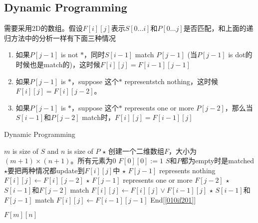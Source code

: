 \subsection{Dynamic Programming}
需要采用2D的数组。假设$F[i][j]$表示$S[0\ldots i]$和$P[0\ldots j]$是否匹配，和上面的递归方法中的分析一样有下面三种情况
\begin{enumerate}
\item 如果$P[j-1]$ is not $\ast$，同时$S[i-1]$ match $P[j-1]$ (当$P[j-1]$ is dot的时候也是match的)，这时候$F[i][j]=F[i-1][j-1]$
\item 如果$P[j-1]$ is $\ast$，suppose 这个$\ast$ representstch nothing，这时候$F[i][j] = F[i][j-2]$。
\item 如果$P[j-1]$ is $\ast$，suppose 这个$\ast$ represents one or more $P[j-2]$，那么当$S[i-1]$和$P[j-2]$ match时，$F[i][j] = F[i-1][j]$
\end{enumerate}
\begin{algorithm}[H]
\caption{Dynamic Programming}
\begin{algorithmic}[1]
 \Comment $m$ is size of $S$ and $n$ is size of $P$
\State $\star$ 创建一个二维数组$F$，大小为$(m+1)\times(n+1)$。所有元素为0
\State $F[0][0]:=1$ \Comment $S$和$P$都为empty时是matched
 \label{010if201}
\State $\star$要把两种情况都update到$F[i][j]$中
\State $\star$ $F[j-1]$ represents nothing
\State $F[i][j] \gets F[i][j-2]$
\State $\star$ $F[j-1]$ represents one or more $F[j-2]$
\State $\star$ $S[i-1]$和$F[j-2]$ match
\State $F[i][j]\gets F[i][j]\lor F[i-1][j]$
\EndIf
\Else
{}
\State $\star$ $S[i-1]$和$F[j-1]$ match
\State $F[i][j]\gets F[i-1][j-1]$
\EndIf
\EndIf \Comment End[\ref{010if201}]
\end{algorithmic}
\end{algorithm}
\begin{algorithm}[H]
\begin{algorithmic}[1]
\EndFor
\EndFor
\State \Return $F[m][n]$
\EndProcedure
\end{algorithmic}
\end{algorithm}
